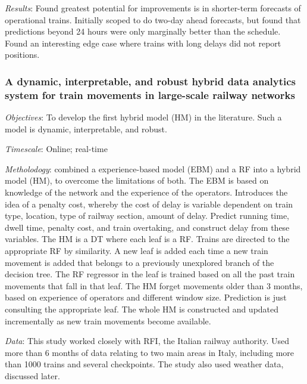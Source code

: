 \documentclass{article}
\begin{document}
\smallskip

\textit{Results}: Found greatest potential for improvements is in shorter-term forecasts of operational trains. Initially scoped to do two-day ahead forecasts, but found that predictions beyond 24 hours were only marginally better than the schedule. Found an interesting edge case where trains with long delays did not report positions. 

\subsubsection{A dynamic, interpretable, and robust hybrid data analytics system for train movements in large-scale railway networks \cite{oneto_et_al_2019}}

\textit{Objectives}: To develop the first hybrid model (HM) in the literature. Such a model is dynamic, interpretable, and robust.

\smallskip

\textit{Timescale}: Online; real-time

\smallskip

\textit{Metholodogy}: combined a experience-based model (EBM) and a RF into a hybrid model (HM), to overcome the limitations of both. The EBM is based on knowledge of the network and the experience of the operators.  Introduces the idea of a penalty cost, whereby the cost of delay is variable dependent on train type, location, type of railway section, amount of delay. Predict running time, dwell time, penalty cost, and train overtaking, and construct delay from these variables. The HM is a DT where each leaf is a RF. Trains are directed to the appropriate RF by similarity. A new leaf is added each time a new train movement is added that belongs to a previously unexplored branch of the decision tree. The RF regressor in the leaf is trained based on all the past train movements that fall in that leaf. The HM forget movements older than 3 months, based on experience of operators and different window size. Prediction is just consulting the appropriate leaf. The whole HM is constructed and updated incrementally as new train movements become available.

\smallskip

\textit{Data}: This study worked closely with RFI, the Italian railway authority. Used more than 6 months of data relating to two main areas in Italy, including more than 1000 trains and several checkpoints. The study also used weather data, discussed later. 
\end{document}
